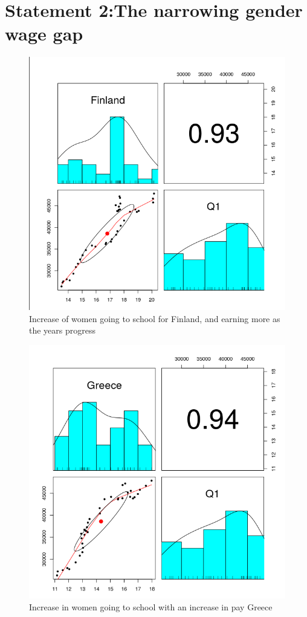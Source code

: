 \documentclass[12pt]{article}
\begin{document}
\section{Statement 2:The narrowing gender wage gap}

\begin{figure}[h!]
\caption{Increase of women going to school for Finland, and earning more as the years progress}
\centering
\includegraphics[scale=.5]{quest2Finland.png}
\end{figure}
\clearpage

\begin{figure}[h!]
\caption{Increase in women going to school  with an increase in pay Greece}
\centering
\includegraphics[scale=.5]{quest2Greece.png}
\end{figure}
\end{document}

